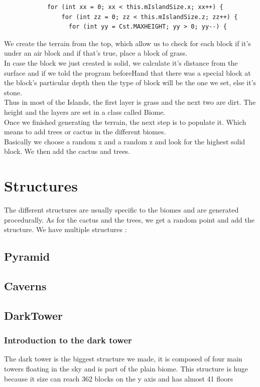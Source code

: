 \documentclass[article]{report}         %
\begin{document}
          \begin{lstlisting}  
            for (int xx = 0; xx < this.mIslandSize.x; xx++) {
                for (int zz = 0; zz < this.mIslandSize.z; zz++) {
                  for (int yy = Cst.MAXHEIGHT; yy > 0; yy--) {
          \end{lstlisting}

            We create the terrain from the top, which allow us to check for each block if it's under an air block and if that's true, place a block of grass.\\
            In case the block we just created is solid, we calculate it's distance from the surface and if we told the program beforeHand that there was a special block at the block's particular depth then the type of block will be the one we set, else it's stone.\\
            Thus in most of the Islands, the first layer is grass and the next two are dirt. The height and the layers are set in a class called Biome.\\

          Once we finished generating the terrain, the next step is to populate it. Which means to add trees or cactus in the different biomes.\\
          Basically we choose a random x and a random z and look for the highest solid block. We then add the cactus and trees.  
      \section{Structures}
          The different structures are usually specific to the biomes and are generated procedurally. As for the cactus and the trees, we get a random point and add the structure.
          We have multiple structures :
          \subsection{Pyramid}
          \subsection{Caverns}
          \subsection{DarkTower}
        \subsubsection{Introduction to the dark tower}
          The dark tower is the biggest structure we made, it is composed of four main towers floating in the sky and is part of the plain biome. This structure is huge because it size can reach 362 blocks on the y axis and has almost 41 floors
\end{document}

